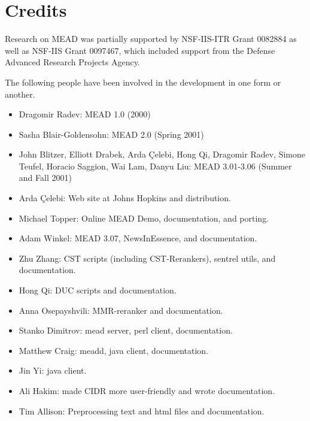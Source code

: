 \documentclass[10pt]{article}
\begin{document}
\section{Credits}

Research on MEAD was partially supported by NSF-IIS-ITR Grant 0082884
as well as NSF-IIS Grant 0097467, which included support from the
Defense Advanced Research Projects Agency.

\noindent
The following people have been involved in the development in one form
or another.

\begin{itemize}

\item Dragomir Radev: MEAD 1.0 (2000)

\item Sasha Blair-Goldensohn: MEAD 2.0 (Spring 2001)

\item John Blitzer, Elliott Drabek, Arda \c{C}elebi, Hong Qi, 
  Dragomir Radev, Simone Teufel, Horacio Saggion, 
  Wai Lam, Danyu Liu: MEAD 3.01-3.06 (Summer and Fall 2001)

\item Arda \c{C}elebi: Web site at Johns Hopkins and distribution.

\item Michael Topper: Online MEAD Demo, documentation, and porting.

\item Adam Winkel: MEAD 3.07, NewsInEssence, and documentation.

\item Zhu Zhang: CST scripts (including CST-Rerankers), sentrel utils,
 and documentation.

\item Hong Qi: DUC scripts and documentation.

\item Anna Osepayshvili: MMR-reranker and documentation.

\item Stanko Dimitrov: mead server, perl client, documentation.

\item Matthew Craig: meadd, java client, documentation.

\item Jin Yi: java client.

\item Ali Hakim: made CIDR more user-friendly and wrote documentation.

\item Tim Allison: Preprocessing text and html files and documentation.


\end{itemize}
\end{document}
